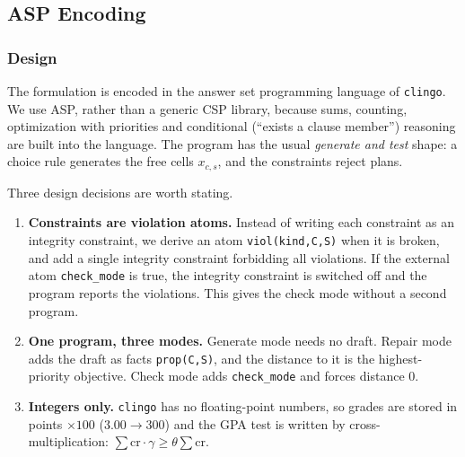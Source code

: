 \lstset{style=clingostyle}

\subsection{ASP Encoding}
\label{sec:encoding}
 
\subsubsection{Design}
 
The formulation is encoded in the answer set programming language of
\texttt{clingo}. We use ASP, rather than a generic CSP library, because
sums, counting, optimization with priorities and conditional (``exists a
clause member'') reasoning are built into the language.
The program has the usual \emph{generate and test} shape:
a choice rule generates the free cells $x_{c,s}$, and the constraints reject
plans.
 
Three design decisions are worth stating.
\begin{enumerate}
  \item \textbf{Constraints are violation atoms.}
        Instead of writing each constraint as an integrity constraint, we
        derive an atom \texttt{viol(kind,C,S)} when it is broken, and add a
        single integrity constraint forbidding all violations. If the
        external atom \texttt{check\_mode} is true, the integrity constraint
        is switched off and the program reports the violations. This gives
        the check mode without a second program.
  \item \textbf{One program, three modes.} Generate mode needs no draft.
        Repair mode adds the draft as facts \texttt{prop(C,S)}, and the
        distance to it is the highest-priority objective. Check mode adds
        \texttt{check\_mode} and forces distance $0$.
  \item \textbf{Integers only.} \texttt{clingo} has no floating-point
        numbers, so grades are stored in points $\times 100$
        ($3.00\to300$) and the GPA test is written by cross-multiplication:
        $\sum \mathrm{cr}\cdot\gamma \ge \theta \sum \mathrm{cr}$.
\end{enumerate}
 
